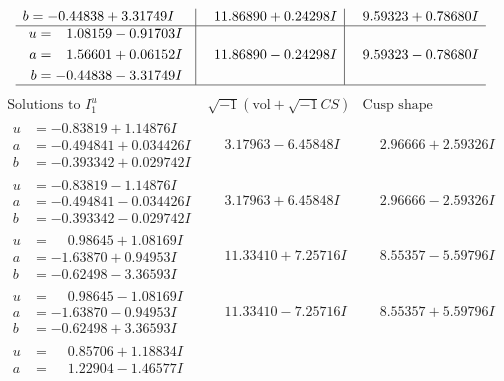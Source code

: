 \documentclass[1p]{elsarticle_modified}
\theoremstyle{definition}
\newcommand{\I}{\sqrt{-1}}
\begin{document}
$$\begin{array}{c|c|c}
\begin{aligned}
b &= -0.44838 + 3.31749 I\end{aligned}
 & \phantom{-}11.86890 + 0.24298 I & \phantom{-}9.59323 + 0.78680 I \\ \hline\begin{aligned}
u &= \phantom{-}1.08159 - 0.91703 I \\
a &= \phantom{-}1.56601 + 0.06152 I \\
b &= -0.44838 - 3.31749 I\end{aligned}
 & \phantom{-}11.86890 - 0.24298 I & \phantom{-}9.59323 - 0.78680 I\\
 \hline 
 \end{array}$$\newpage$$\begin{array}{c|c|c}  
\text{Solutions to }I^u_{1}& \I (\text{vol} + \sqrt{-1}CS) & \text{Cusp shape}\\
 \hline 
\begin{aligned}
u &= -0.83819 + 1.14876 I \\
a &= -0.494841 + 0.034426 I \\
b &= -0.393342 + 0.029742 I\end{aligned}
 & \phantom{-}3.17963 - 6.45848 I & \phantom{-}2.96666 + 2.59326 I \\ \hline\begin{aligned}
u &= -0.83819 - 1.14876 I \\
a &= -0.494841 - 0.034426 I \\
b &= -0.393342 - 0.029742 I\end{aligned}
 & \phantom{-}3.17963 + 6.45848 I & \phantom{-}2.96666 - 2.59326 I \\ \hline\begin{aligned}
u &= \phantom{-}0.98645 + 1.08169 I \\
a &= -1.63870 + 0.94953 I \\
b &= -0.62498 - 3.36593 I\end{aligned}
 & \phantom{-}11.33410 + 7.25716 I & \phantom{-}8.55357 - 5.59796 I \\ \hline\begin{aligned}
u &= \phantom{-}0.98645 - 1.08169 I \\
a &= -1.63870 - 0.94953 I \\
b &= -0.62498 + 3.36593 I\end{aligned}
 & \phantom{-}11.33410 - 7.25716 I & \phantom{-}8.55357 + 5.59796 I \\ \hline\begin{aligned}
u &= \phantom{-}0.85706 + 1.18834 I \\
a &= \phantom{-}1.22904 - 1.46577 I \\

\end{aligned}
\end{array}$$
\end{document}

